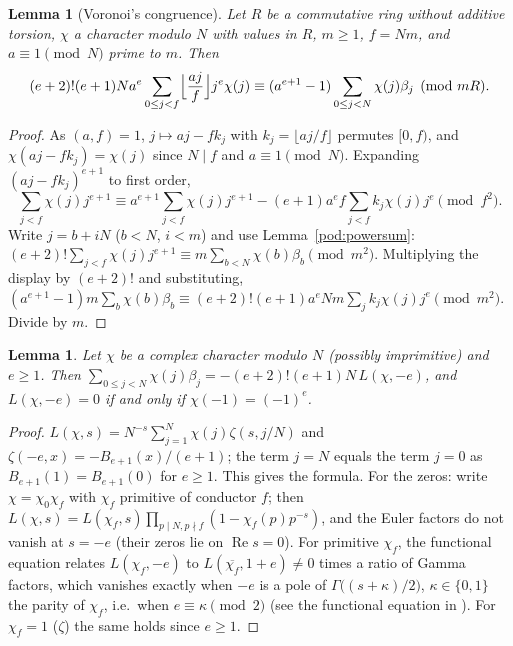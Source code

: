 \documentclass[10pt]{amsart}
\newtheorem{lemma}[theorem]{Lemma}
\theoremstyle{definition}
\theoremstyle{remark}
\newcommand{\Rel}{\operatorname{Re}}
\begin{document}
\begin{lemma}[Voronoi's congruence]\label{pod:voronoi}
Let $R$ be a commutative ring without additive torsion, $\chi$ a character modulo $N$ with values in
$R$, $m\ge1$, $f=Nm$, and $a\equiv1\pmod N$ prime to $m$. Then
\[
(e+2)!(e+1)N a^e\sum_{0\le j<f}\Bigl\lfloor\frac{aj}{f}\Bigr\rfloor j^e\chi(j)\equiv
(a^{e+1}-1)\sum_{0\le j<N}\chi(j)\beta_j\pmod{mR}.
\]
\end{lemma}
\begin{proof}
As $(a,f)=1$, $j\mapsto aj-fk_j$ with $k_j=\lfloor aj/f\rfloor$ permutes $[0,f)$, and $\chi(aj-fk_j)=
\chi(j)$ since $N\mid f$ and $a\equiv1\pmod N$. Expanding $(aj-fk_j)^{e+1}$ to first order,
\[
\sum_{j<f}\chi(j)j^{e+1}\equiv a^{e+1}\sum_{j<f}\chi(j)j^{e+1}-(e+1)a^ef\sum_{j<f}k_j\chi(j)j^e
\pmod{f^2}.
\]
Write $j=b+iN$ ($b<N$, $i<m$) and use Lemma~\ref{pod:powersum}: $(e+2)!\sum_{j<f}\chi(j)j^{e+1}\equiv
m\sum_{b<N}\chi(b)\beta_b\pmod{m^2}$. Multiplying the display by $(e+2)!$ and substituting,
$(a^{e+1}-1)m\sum_b\chi(b)\beta_b\equiv(e+2)!(e+1)a^eNm\sum_jk_j\chi(j)j^e\pmod{m^2}$. Divide by $m$.
\end{proof}

\begin{lemma}\label{pod:L}
Let $\chi$ be a complex character modulo $N$ \textup(possibly imprimitive\textup) and $e\ge1$. Then
$\sum_{0\le j<N}\chi(j)\beta_j=-(e+2)!(e+1)N\,L(\chi,-e)$, and $L(\chi,-e)=0$ if and only if
$\chi(-1)=(-1)^e$.
\end{lemma}
\begin{proof}
$L(\chi,s)=N^{-s}\sum_{j=1}^N\chi(j)\zeta(s,j/N)$ and $\zeta(-e,x)=-B_{e+1}(x)/(e+1)$; the term $j=N$
equals the term $j=0$ as $B_{e+1}(1)=B_{e+1}(0)$ for $e\ge1$. This gives the formula. For the zeros:
write $\chi=\chi_0\chi_f$ with $\chi_f$ primitive of conductor $f$; then $L(\chi,s)=L(\chi_f,s)
\prod_{p\mid N,p\nmid f}(1-\chi_f(p)p^{-s})$, and the Euler factors do not vanish at $s=-e$ (their
zeros lie on $\Rel s=0$). For primitive $\chi_f$, the functional equation relates $L(\chi_f,-e)$ to
$L(\overline{\chi_f},1+e)\ne0$ times a ratio of Gamma factors, which vanishes exactly when $-e$ is a
pole of $\Gamma\bigl((s+\kappa)/2\bigr)$, $\kappa\in\{0,1\}$ the parity of $\chi_f$, i.e.\ when
$e\equiv\kappa\pmod2$ (see the functional equation in \cite[Chapter~4]{Washington}). For $\chi_f=1$ ($\zeta$) the same holds since $e\ge1$.
\end{proof}
\end{document}
